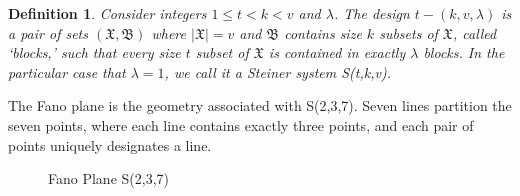 \documentclass[paper=a4, fontsize=11pt]{scrartcl} %
\numberwithin{equation}{section} %
\numberwithin{figure}{section} %
\numberwithin{table}{section} %
\newtheorem{defn}{Definition}
\begin{document}
\begin{defn}
Consider integers $1 \leq t < k < v$ and $\lambda$. The design $t-(k,v,\lambda)$ is a pair of sets $(\mathfrak{X},\mathfrak{B})$ where $|\mathfrak{X}|=v$ and $\mathfrak{B}$ contains size $k$ subsets of $\mathfrak{X}$, called `blocks,' such that every size $t$ subset of $\mathfrak{X}$ is contained in exactly $\lambda$ blocks. In the particular case that $\lambda=1$, we call it a \textit{Steiner system} S(t,k,v).
\end{defn}

The Fano plane is the geometry associated with S(2,3,7). Seven lines partition the seven points, where each line contains exactly three points, and each pair of points uniquely designates a line.

\begin{figure}[hbp]
\centering
{}
\caption{Fano Plane S(2,3,7)} \label{fig:fplane}
\end{figure}
\end{document}
